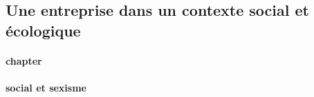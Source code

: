 \subsection{Une entreprise dans un contexte social et écologique}
\paragraph{chapter}
\paragraph{social et sexisme}
